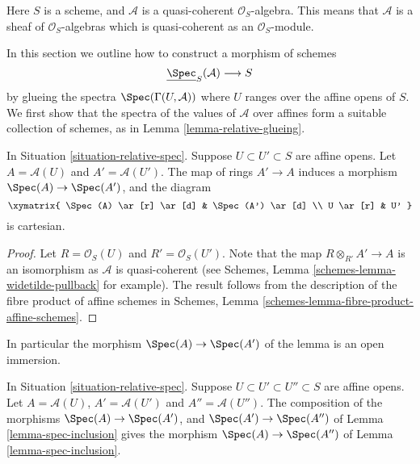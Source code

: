 \begin{situation}
\label{situation-relative-spec}
Here $S$ is a scheme, and $\mathcal{A}$ is a quasi-coherent
$\mathcal{O}_S$-algebra. This means that $\mathcal{A}$ is a
sheaf of $\mathcal{O}_S$-algebras which is quasi-coherent as an
$\mathcal{O}_S$-module.
\end{situation}

\noindent
In this section we outline how to construct a morphism
of schemes
$$
\underline{\Spec}_S(\mathcal{A}) \longrightarrow S
$$
by glueing the spectra $\Spec(\Gamma(U, \mathcal{A}))$
where $U$ ranges over the affine opens of $S$. We first show that the
spectra of the values of $\mathcal{A}$ over affines form a
suitable collection of schemes, as in Lemma \ref{lemma-relative-glueing}.

\begin{lemma}
\label{lemma-spec-inclusion}
In Situation \ref{situation-relative-spec}.
Suppose $U \subset U' \subset S$ are affine opens.
Let $A = \mathcal{A}(U)$ and $A' = \mathcal{A}(U')$.
The map of rings $A' \to A$ induces a morphism
$\Spec(A) \to \Spec(A')$, and the diagram
$$
\xymatrix{
\Spec(A) \ar[r] \ar[d] &
\Spec(A') \ar[d] \\
U \ar[r] &
U'
}
$$
is cartesian.
\end{lemma}

\begin{proof}
Let $R = \mathcal{O}_S(U)$ and $R' = \mathcal{O}_S(U')$.
Note that the map $R \otimes_{R'} A' \to A$ is an isomorphism as
$\mathcal{A}$ is quasi-coherent
(see Schemes, Lemma \ref{schemes-lemma-widetilde-pullback} for example).
The result follows from the description of the fibre product of
affine schemes in
Schemes, Lemma \ref{schemes-lemma-fibre-product-affine-schemes}.
\end{proof}

\noindent
In particular the morphism $\Spec(A) \to \Spec(A')$
of the lemma is an open immersion.

\begin{lemma}
\label{lemma-transitive-spec}
In Situation \ref{situation-relative-spec}.
Suppose $U \subset U' \subset U'' \subset S$ are affine opens.
Let $A = \mathcal{A}(U)$, $A' = \mathcal{A}(U')$ and $A'' = \mathcal{A}(U'')$.
The composition of the morphisms
$\Spec(A) \to \Spec(A')$, and
$\Spec(A') \to \Spec(A'')$ of
Lemma \ref{lemma-spec-inclusion} gives the
morphism $\Spec(A) \to \Spec(A'')$
of Lemma \ref{lemma-spec-inclusion}.
\end{lemma}

